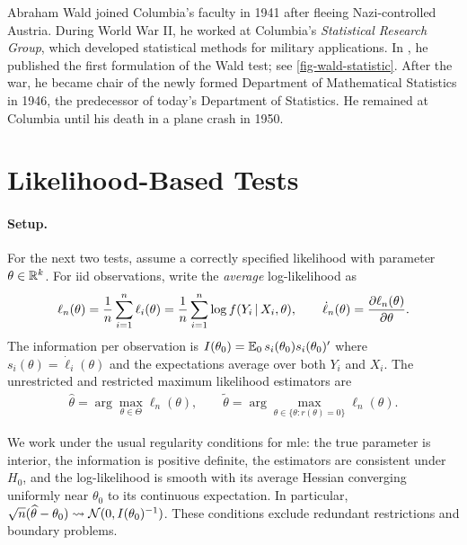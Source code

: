 \documentclass[a4paper,12pt]{article}
\begin{document}
\begin{remark}
	Abraham Wald joined Columbia's faculty in 1941 after fleeing Nazi-controlled Austria.
	During World War II,
	he worked at Columbia's \emph{Statistical Research Group},
	which developed statistical methods for military applications.
	In \citeyear{wald-1943}, he published the first formulation of the Wald test; see \autoref{fig-wald-statistic}.
	After the war, he became chair of the newly formed Department of Mathematical Statistics in 1946,
	the predecessor of today's Department of Statistics.
	He remained at Columbia until his death in a plane crash in 1950.
\end{remark}

\section{Likelihood-Based Tests}

\paragraph{Setup.}

For the next two tests, assume a correctly specified likelihood with parameter $\theta\in\mathbb{R}^k$.
For \gls{iid} observations, write the \emph{average} log-likelihood as
\begin{align}
	\ell_n(\theta)
	= \frac1n\sum_{i=1}^n \ell_i(\theta)
	= \frac1n\sum_{i=1}^n \log f(Y_i\mathpunct{}|\mathpunct{} X_i, \theta),
	\qquad
	\dot\ell_n(\theta)=\frac{\partial\ell_n(\theta)}{\partial\theta}.
\end{align}
The information per observation is $I(\theta_0) = \operatorname{\mathbb{E}}_0 s_i(\theta_0)s_i(\theta_0)^{\prime}$
where $s_i(\theta)=\dot\ell_i(\theta)$ and
the expectations average over both $Y_i$ and $X_i$.
The unrestricted and restricted maximum likelihood estimators are
\begin{align}
	\widehat\theta=\arg\max_{\theta\in\Theta}\ell_n(\theta),
	\qquad
	\widetilde\theta=\arg\max_{\theta\in\{\theta:r(\theta)=0\}}\ell_n(\theta).
\end{align}

\begin{remark}[Regularity]
	We work under the usual regularity conditions for \gls{mle}:
	the true parameter is interior, the information is positive definite, the estimators are consistent under $H_0$,
	and the log-likelihood is smooth with its average Hessian converging uniformly near $\theta_0$ to its continuous expectation.
	In particular,
	$\sqrt n(\widehat\theta-\theta_0)\overset{}{\leadsto}\operatorname{\mathcal{N}}(0,I(\theta_0)^{-1})$.
	These conditions exclude redundant restrictions and boundary problems.
\end{remark}
\end{document}
